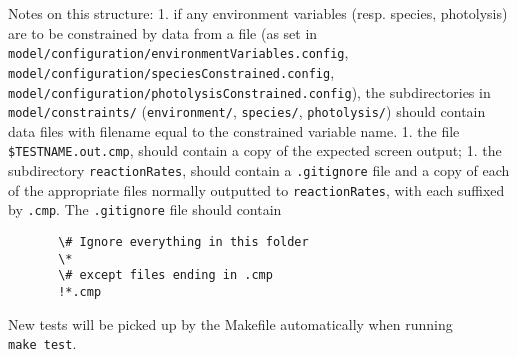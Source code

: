 Notes on this structure: 1. if any environment variables (resp. species,
photolysis) are to be constrained by data from a file (as set in
\texttt{model/configuration/environmentVariables.config},
\texttt{model/configuration/speciesConstrained.config},
\texttt{model/configuration/photolysisConstrained.config}), the
subdirectories in \texttt{model/constraints/} (\texttt{environment/},
\texttt{species/}, \texttt{photolysis/}) should contain data files with
filename equal to the constrained variable name. 1. the file
\texttt{\$TESTNAME.out.cmp}, should contain a copy of the expected
screen output; 1. the subdirectory \texttt{reactionRates}, should
contain a \texttt{.gitignore} file and a copy of each of the appropriate
files normally outputted to \texttt{reactionRates}, with each suffixed
by \texttt{.cmp}. The \texttt{.gitignore} file should contain

\begin{verbatim}
       \# Ignore everything in this folder
       \*
       \# except files ending in .cmp
       !*.cmp
\end{verbatim}

New tests will be picked up by the Makefile automatically when running
\texttt{make\ test}.
